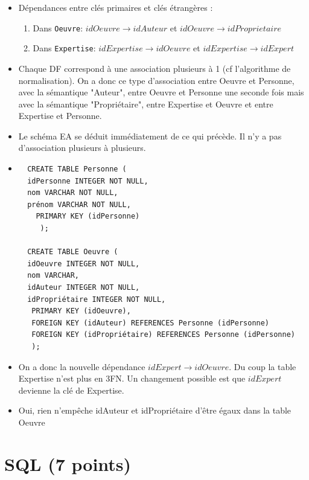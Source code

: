\begin{solution}


\begin{itemize}
\item Dépendances entre clés primaires et clés étrangères :
   \begin{enumerate}
      \item Dans \texttt{Oeuvre}: $idOeuvre \to idAuteur$ et $idOeuvre \to idProprietaire$
       \item Dans \texttt{Expertise}: $idExpertise \to idOeuvre$ et $idExpertise \to idExpert$
  \end{enumerate}
   \item Chaque DF correspond à une association plusieurs à 1 (cf l'algorithme de normalisation).
       On a donc ce type d'association entre Oeuvre et Personne, avec la sémantique "Auteur",
       entre Oeuvre et Personne une seconde fois mais avec la sémantique "Propriétaire",
         entre Expertise et Oeuvre et entre Expertise et Personne.
        \item Le schéma EA se déduit immédiatement de ce qui précède. Il n'y a pas d'association
        plusieurs à plusieurs.

 \item
  \begin{verbatim}
  CREATE TABLE Personne (
  idPersonne INTEGER NOT NULL,
  nom VARCHAR NOT NULL,
  prénom VARCHAR NOT NULL,
    PRIMARY KEY (idPersonne)
     );

  CREATE TABLE Oeuvre (
  idOeuvre INTEGER NOT NULL,
  nom VARCHAR,
  idAuteur INTEGER NOT NULL,
  idPropriétaire INTEGER NOT NULL,
   PRIMARY KEY (idOeuvre),
   FOREIGN KEY (idAuteur) REFERENCES Personne (idPersonne)
   FOREIGN KEY (idPropriétaire) REFERENCES Personne (idPersonne)
   );
  \end{verbatim}

  \item On a donc la nouvelle dépendance $idExpert \to idOeuvre$. Du coup la table Expertise
      n'est plus en 3FN. Un changement possible est que $idExpert$ devienne la clé
      de Expertise.
      \item Oui, rien n'empêche  idAuteur et idPropriétaire d'être égaux dans la table Oeuvre
\end{itemize}
\end{solution}


\section{SQL (7 points)}


